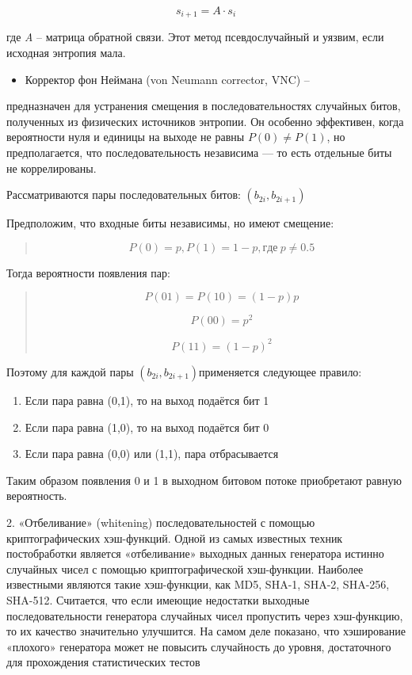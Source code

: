 \[s_{i + 1} = A \cdot s_{i}\]

где \emph{A} -- матрица обратной связи. Этот метод псевдослучайный и
уязвим, если исходная энтропия мала.

\begin{itemize}
\item
  Корректор фон Неймана (von Neumann corrector, VNC) --
\end{itemize}

предназначен для устранения смещения в последовательностях случайных
битов, полученных из физических источников энтропии. Он особенно
эффективен, когда вероятности нуля и единицы на выходе не равны
\(P(0) \neq P(1)\), но предполагается, что последовательность независима
--- то есть отдельные биты не коррелированы.

Рассматриваются пары последовательных битов: \((b_{2i},b_{2i + 1})\)

Предположим, что входные биты независимы, но имеют смещение:

\begin{quote}
\[P(0) = p,P(1) = 1 - p,где\ p \neq 0.5\]
\end{quote}

Тогда вероятности появления пар:

\begin{quote}
\[P(01) = P(10) = (1 - p)p\]

\[P(00) = p^{2}\]

\[P(11) = (1 - p)^{2}\]
\end{quote}

Поэтому для каждой пары \(\left( b_{2i},b_{2i + 1} \right)\)применяется
следующее правило:

\begin{enumerate}
\def\labelenumi{\arabic{enumi}.}
\item
  Если пара равна (0,1), то на выход подаётся бит 1
\item
  Если пара равна (1,0), то на выход подаётся бит 0
\item
  Если пара равна (0,0) или (1,1), пара отбрасывается
\end{enumerate}

Таким образом появления 0 и 1 в выходном битовом потоке приобретают
равную вероятность.

2. «Отбеливание» (whitening) последовательностей с помощью
криптографических хэш-функций. Одной из самых известных техник
постобработки является «отбеливание» выходных данных генератора истинно
случайных чисел с помощью криптографической хэш-функции. Наиболее
известными являются такие хэш-функции, как MD5, SHA-1, SHA-2, SHA-256,
SHA-512. Считается, что если имеющие недостатки выходные
последовательности генератора случайных чисел пропустить через
хэш-функцию, то их качество значительно улучшится. На самом деле
показано, что хэширование «плохого» генератора может не повысить
случайность до уровня, достаточного для прохождения статистических
тестов


